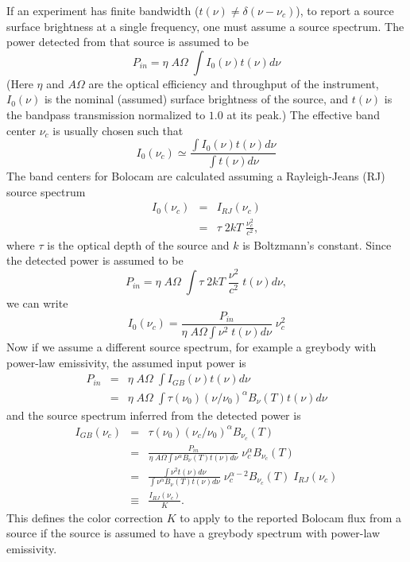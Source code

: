 \documentclass[12pt,preprint]{aastex}
\begin{document}
If an experiment has finite bandwidth ($t(\nu) \ne \delta(\nu -
\nu_c)$), to report a source surface brightness at a single
frequency, one must assume a source spectrum.  The power detected from
that source is assumed to be
\begin{equation}
P_{in} = \eta \; A \Omega \; \int I_0(\nu) t(\nu) d \nu
\end{equation}
(Here $\eta$ and $A \Omega$ are the optical efficiency and throughput
of the instrument, $I_0(\nu)$ is the nominal (assumed) surface
brightness of the source, and $t(\nu)$ is the bandpass transmission
normalized to $1.0$ at its peak.)  The effective band center $\nu_c$
is usually chosen such that
\begin{equation}
I_0(\nu_c) \simeq \frac{\int I_0(\nu) t(\nu) d \nu}
{\int t(\nu) d \nu} 
\end{equation}
The band centers for Bolocam are calculated assuming a Rayleigh-Jeans
(RJ) source spectrum
\begin{eqnarray}
I_0(\nu_c) & = & I_{RJ}(\nu_c) \\
\nonumber & = & \tau \; 2 k T \; \frac{\nu_c^2}{c^2},
\end{eqnarray}
where $\tau$ is the optical depth of the source and $k$ is Boltzmann's
constant.  Since the detected power is assumed to be
\begin{equation}
P_{in} = \eta \; A \Omega \; \int \tau \; 2 k T \; \frac{\nu^2}{c^2}
\; t(\nu) d \nu,
\end{equation}
we can write
\begin{equation}
I_0(\nu_c) = \frac{P_{in}}{\eta \; A \Omega \int \nu^2 \; t(\nu) d \nu} \; \nu_c^2
\end{equation}
Now if we assume a different source spectrum, for example a greybody
with power-law emissivity, the assumed input power is
\begin{eqnarray}
P_{in} & = & \eta \; A \Omega \; \int I_{GB}(\nu) t(\nu) d \nu \\
\nonumber & = & \eta \; A \Omega \; \int \tau(\nu_0) (\nu / \nu_0)^\alpha B_\nu(T) t(\nu) d \nu
\end{eqnarray}
and the source spectrum inferred from the detected power is
\begin{eqnarray}
I_{GB}(\nu_c) & = & \tau(\nu_0) (\nu_c / \nu_0)^\alpha B_{\nu_c}(T) \\
\nonumber & = & \frac{P_{in}}{\eta \; A \Omega \int \nu^\alpha B_\nu(T) t(\nu) d \nu} \; \nu_c^\alpha B_{\nu_c}(T) \\
\nonumber & = & \frac{\int \nu^2 t(\nu) d \nu}{\int \nu^\alpha B_\nu(T) t(\nu) d \nu} \; \nu_c^{\alpha-2} B_{\nu_c}(T) \; I_{RJ}(\nu_c) \\
\nonumber & \equiv & \frac{I_{RJ}(\nu_c)}{K}.
\end{eqnarray}
This defines the color correction $K$ to apply to the reported Bolocam
flux from a source if the source is assumed to have a greybody
spectrum with power-law emissivity.
\end{document}
